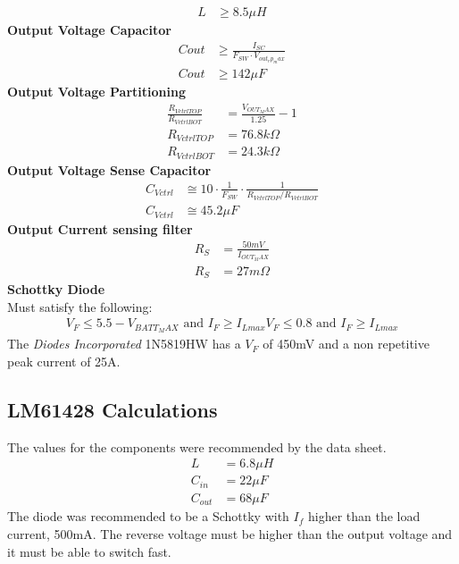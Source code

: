 \documentclass{article}
\numberwithin{figure}{section}
\numberwithin{equation}{section}
\begin{document}
{\begin{align}
  L&\geq 8.5 \mu H
\end{align}
\textbf{Output Voltage Capacitor}
\begin{align}
  \label{eq:outcap}
  Cout &\geq \frac{I_{SC}}{F_{SW}\cdot V_{out_rp_max}} \\
  Cout &\geq 142\mu F
\end{align}
\textbf{Output Voltage Partitioning}
\begin{align}
  \label{eq:outputvpart}
  \frac{R_{VctrlTOP}}{R_{VctrlBOT}} &= \frac{V_{OUT_MAX}}{1.25}-1 \\
  R_{VctrlTOP} &= 76.8k\Omega \\
  R_{VctrlBOT} &= 24.3k\Omega
\end{align}
\textbf{Output Voltage Sense Capacitor}
\begin{align}
  \label{eq:outsensecap}
  C_{Vctrl} &\cong 10\cdot \frac{1}{F_{SW}}\cdot \frac{1}{R_{VctrlTOP}/R_{VctrlBOT}} \\
  C_{Vctrl} &\cong 45.2 \mu F
\end{align}
\textbf{Output Current sensing filter}
\begin{align}
  \label{eq:currentsense}
  R_{S}&= \frac{50mV}{I_{OUT_MAX}} \\
  R_{S}&= 27m\Omega
\end{align}
\textbf{Schottky Diode} \\
Must satisfy the following:
\begin{align*}
  V_F \leq 5.5-V_{BATT_MAX} \mbox{ and } I_F \geq I_{Lmax}
  V_F \leq 0.8 \mbox{ and } I_F \geq I_{Lmax}
\end{align*}
The \textit{Diodes Incorporated }1N5819HW has a $V_F$ of 450mV and a non repetitive peak current of 25A.

\subsection{LM61428 Calculations} \label{app:lm61calcs}
The values for the components were recommended by the data sheet.
\begin{align*}
  L &= 6.8\mu H \\
  C_{in} &= 22\mu F \\
  C_{out} &= 68\mu F
\end{align*}
The diode was recommended to be a Schottky with $I_f$ higher than the load current, 500mA. The reverse voltage must be higher than the output voltage and it must be able to switch fast.

\newpage
}
\end{document}
